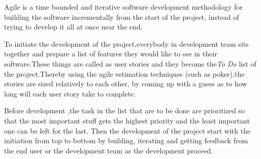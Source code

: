 Agile is a time bounded and iterative software development methodology for building the software incrementally from the start of the project, instead of trying to develop it all at once near the end.

To initiate the development of the project,everybody in development team sits together and prepare a list of features they would like to see in their software.These things are called as user stories and they become the\emph{To Do} list of the project.Thereby using the agile estimation techniques (such as poker),the stories are sized relatively to each other, by coming up with a guess as to how long will each user story take to complete. 

Before development ,the task in the list that are to be done are prioritized  so that the most important stuff gets the highest priority and the least important one can be left for the last.
Then the development of the project start with the initiation from top to bottom by building, iterating and getting feedback from the end user or the development team as the development proceed.